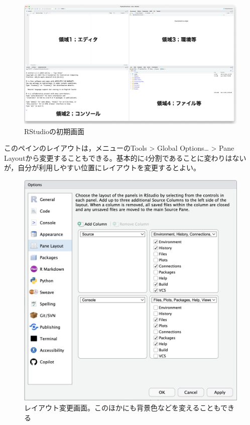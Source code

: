 \documentclass[
  a4paper,
]{ltjsbook}
\begin{document}
\begin{figure}

{\centering \includegraphics{Figs/01_RStudioStart.png}

}

\caption{RStudioの初期画面}

\end{figure}

このペインのレイアウトは，メニューのTools \textgreater{} Global
Options\ldots{} \textgreater{} Pane
Layoutから変更することもできる。基本的に4分割であることに変わりはないが，自分が利用しやすい位置にレイアウトを変更するとよい。

\begin{figure}

{\centering \includegraphics{Figs/01_PaneLayout.png}

}

\caption{レイアウト変更画面。このほかにも背景色などを変えることもできる}

\end{figure}
\end{document}
